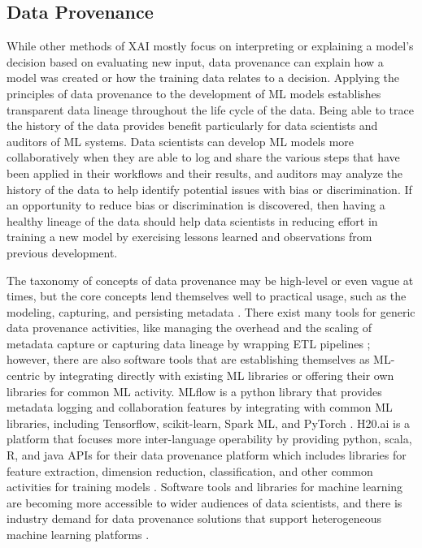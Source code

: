 \subsection{Data Provenance}

While other methods of XAI mostly focus on interpreting or explaining a model's decision based on evaluating new input, data provenance can explain how a model was created or how the training data relates to a decision.  Applying the principles of data provenance to the development of ML models establishes transparent data lineage throughout the life cycle of the data.  Being able to trace the history of the data provides benefit particularly for data scientists and auditors of ML systems.  Data scientists can develop ML models more collaboratively when they are able to log and share the various steps that have been applied in their workflows and their results, and auditors may analyze the history of the data to help identify potential issues with bias or discrimination.  If an opportunity to reduce bias or discrimination is discovered, then having a healthy lineage of the data should help data scientists in reducing effort in training a new model by exercising lessons learned and observations from previous development.

The taxonomy of concepts of data provenance may be high-level or even vague at times, but the core concepts lend themselves well to practical usage, such as the modeling, capturing, and persisting metadata \cite{Simmhan:2005:SDP:1084805.1084812}.  There exist many tools for generic data provenance activities, like managing the overhead and the scaling of metadata capture \cite{Simmhan2005ASO} or capturing data lineage by wrapping ETL pipelines \cite{Interlandi2017}; however, there are also software tools that are establishing themselves as ML-centric by integrating directly with existing ML libraries or offering their own libraries for common ML activity.  MLflow is a python library that provides metadata logging and collaboration features by integrating with common ML libraries, including Tensorflow, scikit-learn, Spark ML, and PyTorch \cite{Zaharia2018}.  H20.ai is a platform that focuses more inter-language operability by providing python, scala, R, and java APIs for their data provenance platform which includes libraries for feature extraction, dimension reduction, classification, and other common activities for training models \cite{H20.ai}.  Software tools and libraries for machine learning are becoming more accessible to wider audiences of data scientists, and there is industry demand for data provenance solutions that support heterogeneous machine learning platforms \cite{Schelter2017}.

